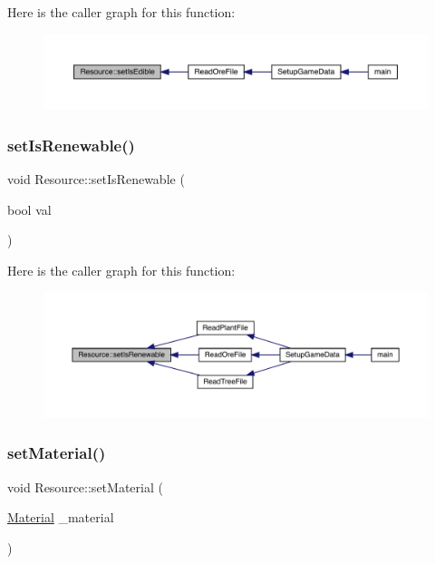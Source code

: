 Here is the caller graph for this function\+:
\nopagebreak
\begin{figure}[H]
\begin{center}
\leavevmode
\includegraphics[width=350pt]{class_resource_a1dab6f1bc6f8794735a6e64c43415587_icgraph}
\end{center}
\end{figure}
\mbox{\label{class_resource_a0782d1437059c7e8449b2c677f9c4b08}} 
\subsubsection{\texorpdfstring{set\+Is\+Renewable()}{setIsRenewable()}}
{\footnotesize\ttfamily void Resource\+::set\+Is\+Renewable (\begin{DoxyParamCaption}\item[{bool}]{val }\end{DoxyParamCaption})}

Here is the caller graph for this function\+:
\nopagebreak
\begin{figure}[H]
\begin{center}
\leavevmode
\includegraphics[width=350pt]{class_resource_a0782d1437059c7e8449b2c677f9c4b08_icgraph}
\end{center}
\end{figure}
\mbox{\label{class_resource_a84958f14311775c18c24cb69d43a74d0}} 
\subsubsection{\texorpdfstring{set\+Material()}{setMaterial()}}
{\footnotesize\ttfamily void Resource\+::set\+Material (\begin{DoxyParamCaption}\item[{\mbox{\hyperlink{class_material}{Material}}}]{\+\_\+material }\end{DoxyParamCaption})}

